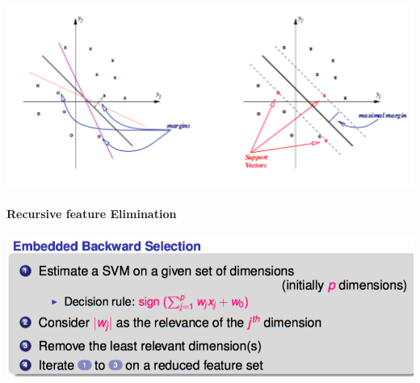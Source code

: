 \begin{center}
	\includegraphics[scale=0.6]{images/68_svm.png}
\end{center}

\paragraph{Recursive feature Elimination}

\begin{center}
	\includegraphics[scale=0.5]{images/69_rec.png}
\end{center}

